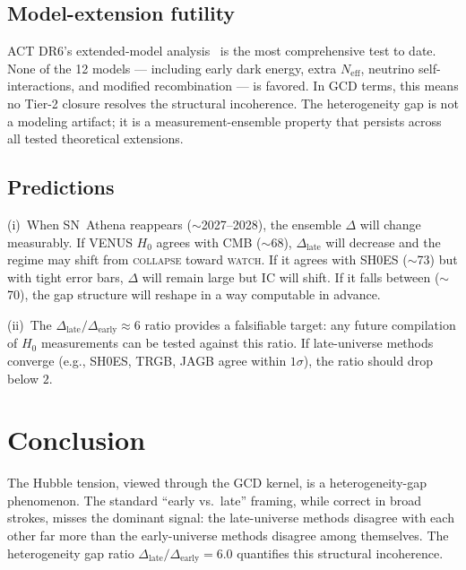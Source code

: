 \documentclass[
  aps,
  prd,
  twocolumn,
  superscriptaddress,
  nofootinbib,
  floatfix
]{revtex4-2}
\newcommand{\regime}[1]{\textrm{\upshape\scshape#1}}
\newcommand{\IC}{\mathrm{IC}}
\newcommand{\hetgap}{\Delta}
\begin{document}
\subsection{Model-extension futility}

ACT DR6's extended-model analysis~\cite{calabrese2025act_ext}
is the most comprehensive test to date.
None of the 12 models --- including early dark energy,
extra $N_{\mathrm{eff}}$, neutrino self-interactions,
and modified recombination --- is favored.
In GCD terms, this means no Tier-2 closure resolves the
structural incoherence.
The heterogeneity gap is not a modeling artifact;
it is a measurement-ensemble property that persists
across all tested theoretical extensions.

\subsection{Predictions}

(i)~When SN~Athena reappears ($\sim$2027--2028), the ensemble
$\hetgap$ will change measurably.
If VENUS $H_0$ agrees with CMB ($\sim$68),
$\hetgap_{\mathrm{late}}$ will decrease and the regime may
shift from \regime{collapse} toward \regime{watch}.
If it agrees with SH0ES ($\sim$73) but with tight error bars,
$\hetgap$ will remain large but $\IC$ will shift.
If it falls between ($\sim$70), the gap structure will
reshape in a way computable in advance.

(ii)~The $\hetgap_{\mathrm{late}}/\hetgap_{\mathrm{early}} \approx 6$
ratio provides a falsifiable target: any future compilation
of $H_0$ measurements can be tested against this ratio.
If late-universe methods converge (e.g., SH0ES, TRGB, JAGB agree
within $1\sigma$), the ratio should drop below $2$.

\section{Conclusion}\label{sec:conclusion}

The Hubble tension, viewed through the GCD kernel, is a
heterogeneity-gap phenomenon.
The standard ``early vs.\ late'' framing, while correct in broad
strokes, misses the dominant signal: the late-universe methods
disagree with each other far more than the early-universe methods
disagree among themselves.
The heterogeneity gap ratio
$\hetgap_{\mathrm{late}}/\hetgap_{\mathrm{early}} = 6.0$
quantifies this structural incoherence.
\end{document}
